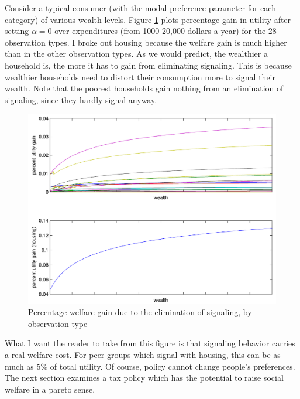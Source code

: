 \documentclass[12pt]{article}
\begin{document}
Consider a typical consumer (with the modal preference parameter for each category) of various wealth levels.  
Figure \ref{fig:uchnge} plots percentage gain in utility after setting $\alpha = 0$ over expenditures (from 1000-20,000 dollars a year) for the 28  observation types.
I broke out housing because the welfare gain is much higher than in the other observation types.
As we would  predict, the wealthier a household is, the more it has to gain from eliminating signaling.
This is because wealthier households need to distort their consumption more to signal their wealth. 
Note that the poorest households gain nothing from an elimination of signaling, since they hardly signal anyway.

\begin{figure}
    \centering
	\includegraphics[scale=.8]{pics/uchnge_cropped.pdf}
    \caption{Percentage welfare gain due to the elimination of signaling, by observation type}
    \label{fig:uchnge}
\end{figure}
What I want the reader to take from this figure is that signaling behavior carries a real welfare cost.  For peer groups which signal with housing, this can be as much as 5\% of total utility.  Of course, policy cannot change people's preferences.  The next section examines a tax policy which has the potential to raise social welfare in a pareto sense.
\end{document}

